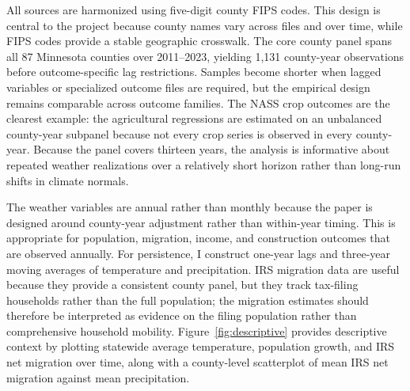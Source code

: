 \documentclass[12pt]{article}
\begin{document}
All sources are harmonized using five-digit county FIPS codes. This design is central to the project because county names vary across files and over time, while FIPS codes provide a stable geographic crosswalk. The core county panel spans all 87 Minnesota counties over 2011--2023, yielding 1,131 county-year observations before outcome-specific lag restrictions. Samples become shorter when lagged variables or specialized outcome files are required, but the empirical design remains comparable across outcome families. The NASS crop outcomes are the clearest example: the agricultural regressions are estimated on an unbalanced county-year subpanel because not every crop series is observed in every county-year. Because the panel covers thirteen years, the analysis is informative about repeated weather realizations over a relatively short horizon rather than long-run shifts in climate normals.

The weather variables are annual rather than monthly because the paper is designed around county-year adjustment rather than within-year timing. This is appropriate for population, migration, income, and construction outcomes that are observed annually. For persistence, I construct one-year lags and three-year moving averages of temperature and precipitation. IRS migration data are useful because they provide a consistent county panel, but they track tax-filing households rather than the full population; the migration estimates should therefore be interpreted as evidence on the filing population rather than comprehensive household mobility. Figure~\ref{fig:descriptive} provides descriptive context by plotting statewide average temperature, population growth, and IRS net migration over time, along with a county-level scatterplot of mean IRS net migration against mean precipitation.
\end{document}
